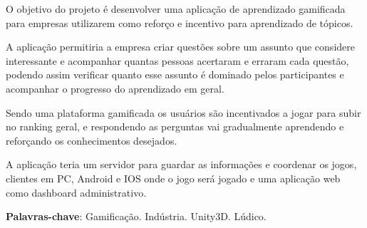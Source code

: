 \setlength{\absparsep}{18pt} %
\begin{resumo}
O objetivo do projeto é desenvolver uma aplicação de aprendizado gamificada para
empresas utilizarem como reforço e incentivo para aprendizado de tópicos.

A aplicação permitiria a empresa criar questões sobre um assunto que considere
interessante e acompanhar quantas pessoas acertaram e erraram cada questão, podendo
assim verificar quanto esse assunto é dominado pelos participantes e acompanhar o
progresso do aprendizado em geral.

Sendo uma plataforma gamificada os usuários são incentivados a jogar para subir
no ranking geral, e respondendo as perguntas vai gradualmente aprendendo e reforçando
os conhecimentos desejados.

A aplicação teria um servidor para guardar as informações e coordenar os jogos,
clientes em PC, Android e IOS onde o jogo será jogado e uma aplicação web como
dashboard administrativo.


 \textbf{Palavras-chave}: Gamificação. Indústria. Unity3D. Lúdico.
\end{resumo}
